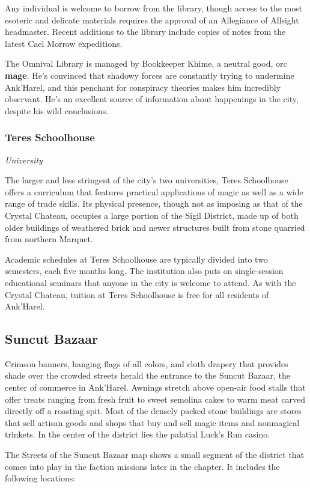 \documentclass[10pt,a4paper,twoside,fancy,bg=print,twocolumn,openany,nodeprecatedcode]{dndbook}
\begin{document}
Any individual is welcome to borrow from the library, though access to the most esoteric and delicate materials requires the approval of an Allegiance of Allsight headmaster. Recent additions to the library include copies of notes from the latest Cael Morrow expeditions.

The Omnival Library is managed by Bookkeeper Khime, a neutral good, orc \textbf{mage}. He's convinced that shadowy forces are constantly trying to undermine Ank'Harel, and this penchant for conspiracy theories makes him incredibly observant. He's an excellent source of information about happenings in the city, despite his wild conclusions.

\subsubsection{Teres Schoolhouse}
\textit{University}

The larger and less stringent of the city's two universities, Teres Schoolhouse offers a curriculum that features practical applications of magic as well as a wide range of trade skills. Its physical presence, though not as imposing as that of the Crystal Chateau, occupies a large portion of the Sigil District, made up of both older buildings of weathered brick and newer structures built from stone quarried from northern Marquet.

Academic schedules at Teres Schoolhouse are typically divided into two semesters, each five months long. The institution also puts on single-session educational seminars that anyone in the city is welcome to attend. As with the Crystal Chateau, tuition at Teres Schoolhouse is free for all residents of Ank'Harel.

\subsection{Suncut Bazaar}
Crimson banners, hanging flags of all colors, and cloth drapery that provides shade over the crowded streets herald the entrance to the Suncut Bazaar, the center of commerce in Ank'Harel. Awnings stretch above open-air food stalls that offer treats ranging from fresh fruit to sweet semolina cakes to warm meat carved directly off a roasting spit. Most of the densely packed stone buildings are stores that sell artisan goods and shops that buy and sell magic items and nonmagical trinkets. In the center of the district lies the palatial Luck's Run casino.

The Streets of the Suncut Bazaar map shows a small segment of the district that comes into play in the faction missions later in the chapter. It includes the following locations:
\end{document}
